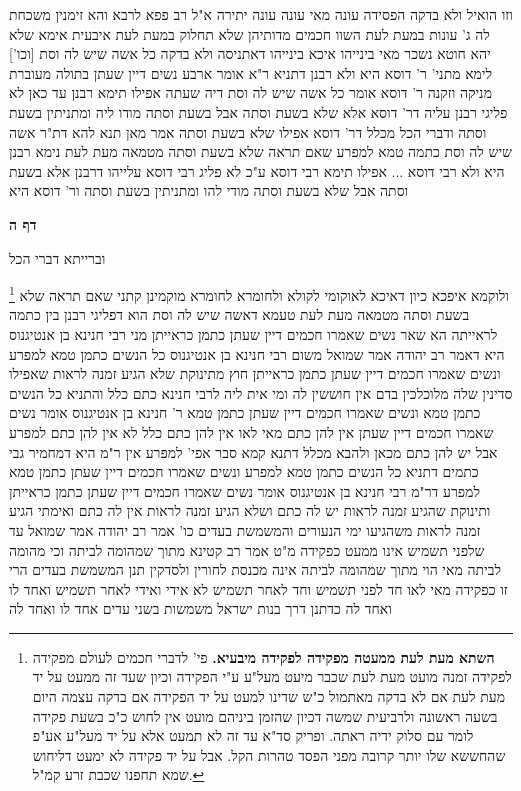 \documentclass[12pt, openany]{book}
\newcommand{\sethebfont}{
\fontsize{10.5pt}{21.0pt} \selectfont
}
\newcommand{\twocol}[1]{
	{\sethebfont \begin{multicols}{2}
			#1
	\end{multicols}}	
}
\newcommand{\sectname}{}
\newcommand{\newsection}[1]{
	\addcontentsline{toc}{section}{#1}
	\renewcommand{\sectname}{#1}	
	\vspace{-\baselineskip}
	\begin{center}
		\textbf{%
\fontsize{16pt}{16pt}\selectfont
			#1}
	\end{center}
	\vspace{-\baselineskip}
	\nopagebreak
}
\newcommand{\footnotecomment}[1]{
	\renewcommand\thefootnote{}
	\footnote{#1}}
\newcommand{\commenta}[1]{\footnotecomment{#1}}
\begin{document}
{וזו הואיל ולא בדקה הפסידה עונה מאי עונה עונה יתירה 
א"ל רב פפא לרבא והא זימנין משכחת לה ג' עונות במעת לעת השוו חכמים מדותיהן שלא תחלוק במעת לעת 
איבעית אימא שלא יהא חוטא נשכר 
מאי בינייהו איכא בינייהו דאתניסה ולא בדקה
כל אשה שיש לה וסת [וכו'] לימא מתני' ר' דוסא היא ולא רבנן דתניא ר"א אומר ארבע נשים דיין שעתן בתולה מעוברת מניקה וזקנה ר' דוסא אומר כל אשה שיש לה וסת דיה שעתה 
אפילו תימא רבנן עד כאן לא פליגי רבנן עליה דר' דוסא אלא שלא בשעת וסתה אבל בשעת וסתה מודו ליה ומתניתין בשעת וסתה ודברי הכל 
מכלל דר' דוסא אפילו שלא בשעת וסתה אמר מאן תנא להא דת"ר אשה שיש לה וסת כתמה טמא למפרע שאם תראה שלא בשעת וסתה מטמאה מעת לעת
נימא רבנן היא ולא רבי דוסא ... אפילו תימא רבי דוסא ע"כ לא פליג רבי דוסא עלייהו דרבנן אלא בשעת וסתה אבל שלא בשעת וסתה מודי להו ומתניתין בשעת וסתה ור' דוסא היא}

\newsection{דף ה}
\twocol{וברייתא דברי הכל 
\commenta{\textbf{השתא מעת לעת ממעטה מפקידה לפקידה מיבעיא.} פי' לדברי חכמים לעולם מפקידה לפקידה זמנה מועט מעת לעת שכבר מיעט מעל"ע ע"י הפקידה וכיון שעד זה ממעט על יד מעת לעת אם לא בדקה מאתמול כ"ש שדינו למעט על יד הפקידה אם בדקה עצמה היום בשעה ראשונה ולרביעית שמשה דכיון שהזמן ביניהם מועט אין לחוש כ"כ בשעת פקידה לומר עם סלוק ידיה ראתה. ופריק סד"א עד זה לא תמעט אלא על יד מעל"ע אע"פ שהחששא שלו יותר קרובה מפני הפסד טהרות הקל. אבל על יד פקידה לא ימעט דליחוש שמא תחפנו שכבת זרע קמ"ל. }
ולוקמא איפכא 
כיון דאיכא לאוקומי לקולא ולחומרא לחומרא מוקמינן 
קתני שאם תראה שלא בשעת וסתה מטמאה מעת לעת טעמא דאשה שיש לה וסת הוא דפליגי רבנן בין כתמה לראייתה
הא שאר נשים שאמרו חכמים דיין שעתן כתמן כראייתן 
מני רבי חנינא בן אנטיגנוס היא דאמר רב יהודה אמר שמואל משום רבי חנינא בן אנטיגנוס כל הנשים כתמן טמא למפרע ונשים שאמרו חכמים דיין שעתן כתמן כראייתן חוץ מתינוקת שלא הגיע זמנה לראות שאפילו סדינין שלה מלוכלכין בדם אין חוששין לה 
ומי אית ליה לרבי חנינא כתם כלל והתניא כל הנשים כתמן טמא ונשים שאמרו חכמים דיין שעתן כתמן טמא ר' חנינא בן אנטיגנוס אומר נשים שאמרו חכמים דיין שעתן אין להן כתם מאי לאו אין להן כתם כלל לא אין להן כתם למפרע אבל יש להן כתם מכאן ולהבא 
מכלל דתנא קמא סבר אפי' למפרע אין ר"מ היא דמחמיר גבי כתמים דתניא כל הנשים כתמן טמא למפרע ונשים שאמרו חכמים דיין שעתן כתמן טמא למפרע דר"מ 
רבי חנינא בן אנטיגנוס אומר נשים שאמרו חכמים דיין שעתן כתמן כראייתן ותינוקת שהגיע זמנה לראות יש לה כתם ושלא הגיע זמנה לראות אין לה כתם ואימתי הגיע זמנה לראות משהגיעו ימי הנעורים
והמשמשת בעדים כו' אמר רב יהודה אמר שמואל עד שלפני תשמיש אינו ממעט כפקידה 
מ"ט אמר רב קטינא מתוך שמהומה לביתה וכי מהומה לביתה מאי הוי מתוך שמהומה לביתה אינה מכנסת לחורין ולסדקין 
תנן המשמשת בעדים הרי זו כפקידה מאי לאו חד לפני תשמיש וחד לאחר תשמיש לא אידי ואידי לאחר תשמיש ואחד לו ואחד לה כדתנן דרך בנות ישראל משמשות בשני עדים אחד לו ואחד לה 
}
\end{document}
